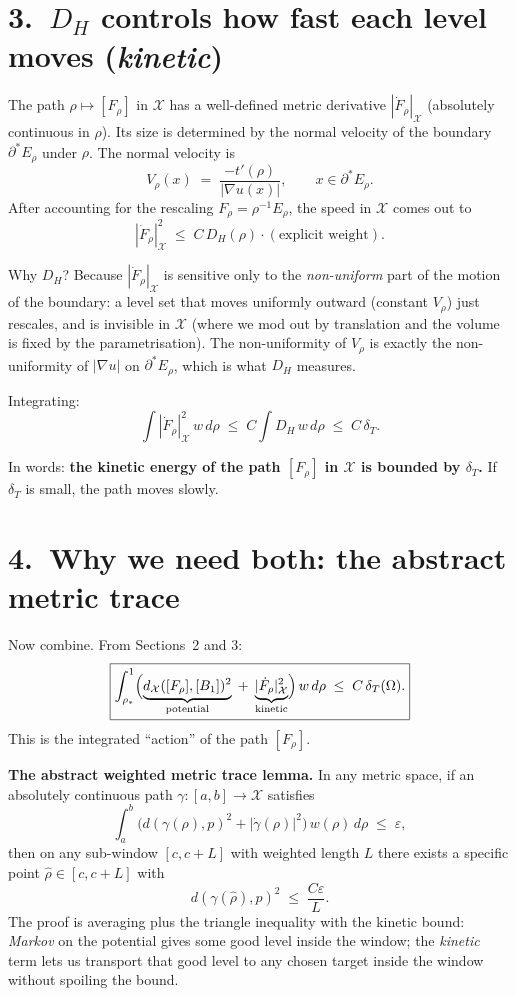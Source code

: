 \documentclass[11pt,a4paper]{article}
\newcommand{\X}{\mathcal{X}}
\newcommand{\Erho}{E_\rho}
\newcommand{\Frho}{F_\rho}
\newcommand{\rhad}{\widehat{\rho}}
\newcommand{\deltaT}{\delta_T}
\newcommand{\dX}{d_{\X}}
\begin{document}
\section*{3.\ $D_H$ controls how fast each level moves (\emph{kinetic})}

The path $\rho \mapsto [\Frho]$ in $\X$ has a well-defined metric derivative $|\dot \Frho|_\X$ (absolutely continuous in $\rho$). Its size is determined by the normal velocity of the boundary $\partial^* \Erho$ under $\rho$. The normal velocity is
\[
V_\rho(x) \;=\; \frac{-t'(\rho)}{|\nabla u(x)|}, \qquad x \in \partial^* \Erho.
\]
After accounting for the rescaling $\Frho = \rho^{-1}\Erho$, the speed in $\X$ comes out to
\[
\boxed{|\dot \Frho|_\X^2 \;\le\; C\, D_H(\rho) \cdot (\text{explicit weight}).}
\]

Why $D_H$? Because $|\dot \Frho|_\X$ is sensitive only to the \emph{non-uniform} part of the motion of the boundary: a level set that moves uniformly outward (constant $V_\rho$) just rescales, and is invisible in $\X$ (where we mod out by translation and the volume is fixed by the parametrisation). The non-uniformity of $V_\rho$ is exactly the non-uniformity of $|\nabla u|$ on $\partial^*\Erho$, which is what $D_H$ measures.

Integrating:
\[
\int |\dot \Frho|_\X^2 \, w\, d\rho \;\le\; C \int D_H\, w\, d\rho \;\le\; C\,\deltaT.
\]

In words: \textbf{the kinetic energy of the path $[\Frho]$ in $\X$ is bounded by $\deltaT$.} If $\deltaT$ is small, the path moves slowly.

\section*{4.\ Why we need both: the abstract metric trace}

Now combine. From Sections~2 and 3:
\[
\boxed{
\int_{\rho_*}^{1}
\Bigl(
\underbrace{\dX([\Frho],[B_1])^2}_{\text{potential}}
\;+\;
\underbrace{|\dot \Frho|_\X^2}_{\text{kinetic}}
\Bigr)\, w\, d\rho
\;\le\;
C\,\deltaT(\Omega).
}
\]
This is the integrated ``action'' of the path $[\Frho]$.

\textbf{The abstract weighted metric trace lemma.} In any metric space, if an absolutely continuous path $\gamma: [a,b] \to \X$ satisfies
\[
\int_a^b \bigl(d(\gamma(\rho), p)^2 + |\dot\gamma(\rho)|^2\bigr)\, w(\rho)\, d\rho \;\le\; \varepsilon,
\]
then on any sub-window $[c,c+L]$ with weighted length $L$ there exists a specific point $\rhad \in [c, c+L]$ with
\[
d(\gamma(\rhad), p)^2 \;\le\; \frac{C \varepsilon}{L}.
\]
The proof is averaging plus the triangle inequality with the kinetic bound: \emph{Markov} on the potential gives some good level inside the window; the \emph{kinetic} term lets us transport that good level to any chosen target inside the window without spoiling the bound.
\end{document}

